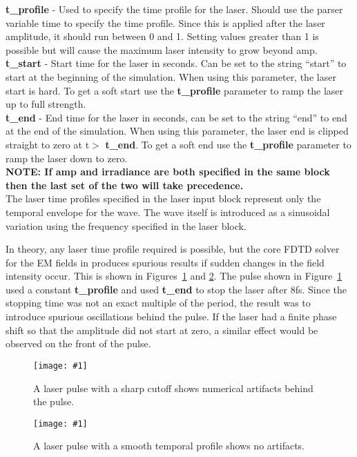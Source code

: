 \documentclass[12pt,a4paper]{article}
\newcommand{\emphtext}{\color{warwickdark} \fontfamily{phv}\selectfont\Large\bf}
\newcommand{\inlineemph}[1]{{\color{warwicklight} \bf{#1}}}
\newcommand{\EPOCH}{{\color{warwickdark}\fontfamily{phv}\selectfont{EPOCH}}}
\newcommand{\captionedimage}[3]
  {{\begin{figure}[hbt!]\centering\texttt{[image: \#1]}\caption{#3}\label{#2}
    \end{figure}}}
\begin{document}
{\emphtext t\_profile} - Used to specify the time profile for the laser. Should
use the parser variable time to specify the time profile. Since this is applied
after the laser amplitude, it should run between 0 and 1. Setting values
greater than 1 is possible but will cause the maximum laser intensity to grow
beyond amp.\\

{\emphtext t\_start} - Start time for the laser in seconds. Can be set to the
string ``start'' to start at the beginning of the simulation. When using this
parameter, the laser start is hard. To get a soft start use the
\inlineemph{t\_profile} parameter to ramp the laser up to full strength.\\

{\emphtext t\_end} - End time for the laser in seconds, can be set to the
string ``end'' to end at the end of the simulation. When using this parameter,
the laser end is clipped straight to zero at t$>$\inlineemph{t\_end}. To get a
soft end use the \inlineemph{t\_profile} parameter to ramp the laser down to
zero.\\

{\emphtext NOTE: If amp and irradiance are both specified in the same block
then the last set of the two will take precedence.}\\

The laser time profiles specified in the laser input block represent only the
temporal envelope for the wave. The wave itself is introduced as a sinusoidal
variation using the frequency specified in the laser block.

In theory, any laser time profile required is possible, but the core FDTD
solver for the EM fields in {\EPOCH} produces spurious results if sudden
changes in the field intensity occur. This is shown in Figures~\ref{badpulse}
and \ref{smoothpulse}. The pulse shown in Figure~\ref{badpulse} used a constant
\inlineemph{t\_profile} and used \inlineemph{t\_end} to stop the laser after
8fs. Since the stopping time was not an exact multiple of the period, the
result was to introduce spurious oscillations behind the pulse. If the laser
had a finite phase shift so that the amplitude did not start at zero, a
similar effect would be observed on the front of the pulse.

\captionedimage{./images/pulse2}{badpulse}{A laser pulse with a sharp
  cutoff shows numerical artifacts behind the pulse.}
\captionedimage{./images/pulse1}{smoothpulse}{A laser pulse with a smooth
  temporal profile shows no artifacts.}
\end{document}

